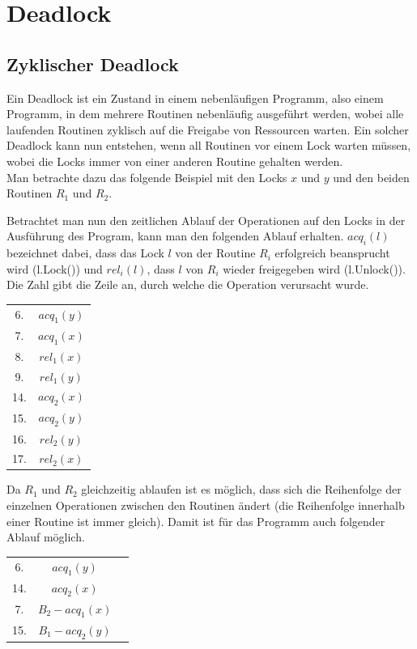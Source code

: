 \section{Deadlock} \label{Kap::Theo:Deadlocks}
\subsection{Zyklischer Deadlock}
Ein Deadlock ist ein Zustand in einem nebenläufigen Programm, also einem 
Programm, in dem mehrere Routinen nebenläufig ausgeführt werden, wobei alle 
laufenden Routinen zyklisch auf die Freigabe von Ressourcen warten.
Ein solcher Deadlock kann nun entstehen, wenn all Routinen vor einem Lock warten 
müssen, wobei die Locks immer von einer anderen Routine gehalten werden.\\
Man betrachte dazu das folgende Beispiel mit den Locks $x$ und $y$ 
und den beiden Routinen $R_1$ und $R_2$.
\begin{figure}[H]
    
\end{figure}
Betrachtet man nun den zeitlichen Ablauf der Operationen auf den Locks in der 
Ausführung des Program, kann man den
folgenden Ablauf erhalten. $acq_i(l)$ bezeichnet dabei, dass das Lock $l$ von der Routine $R_i$ 
erfolgreich beansprucht wird (l.Lock()) und $rel_i(l)$, dass $l$ von $R_i$ wieder 
freigegeben wird (l.Unlock()). Die Zahl gibt die Zeile an, durch welche die Operation verursacht wurde.
\begin{table}[H]
    \centering
    \begin{tabular}{cc}
        6. & $acq_{1}(y)$ \\
        7. & $acq_{1}(x)$ \\
        8. & $rel_{1}(x)$ \\
        9. & $rel_{1}(y)$ \\
        14. & $acq_{2}(x)$ \\
        15. & $acq_{2}(y)$ \\
        16. & $rel_{2}(y)$ \\
        17. & $rel_{2}(x)$
    \end{tabular}
\end{table}
Da $R_1$ und $R_2$ gleichzeitig ablaufen ist es möglich, dass sich die 
Reihenfolge der einzelnen Operationen zwischen den Routinen ändert (die Reihenfolge
innerhalb einer Routine ist immer gleich). Damit ist für das Programm auch folgender Ablauf möglich. 
\begin{table}[H]
    \centering
    \begin{tabular}{ccc}
    6. & $acq_{1}(y)$ \\
    14. & $acq_{2}(x)$ \\
    7. & $B_2-acq_{1}(x)$ \\
    15. & $B_1-acq_{2}(y)$
    \end{tabular}
\end{table}
